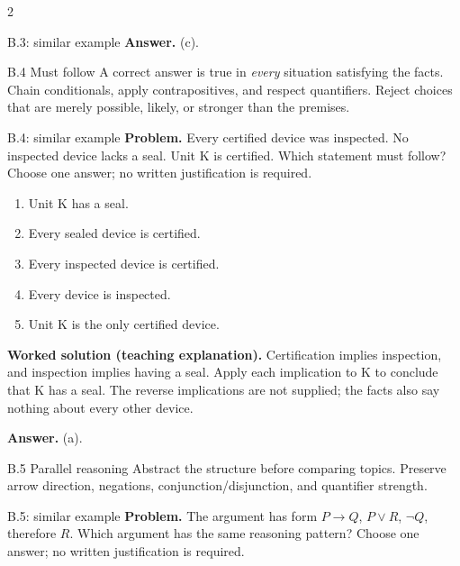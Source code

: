 \documentclass[10pt]{extarticle}
\begin{document}
\begin{multicols}{2}
\begin{workedbox}{B.3: similar example}
\textbf{Answer.} (c).
\end{workedbox}


\columnbreak
\begin{methodbox}{B.4 Must follow}
A correct answer is true in \emph{every} situation satisfying the facts. Chain
conditionals, apply contrapositives, and respect quantifiers. Reject choices that
are merely possible, likely, or stronger than the premises.
\end{methodbox}

\begin{workedbox}{B.4: similar example}
\textbf{Problem.} Every certified device was inspected. No inspected device lacks a seal. Unit K is certified. Which statement must follow? Choose one answer; no written justification is required.

\begin{enumerate}[label=(\alph*)]
\item Unit K has a seal.
\item Every sealed device is certified.
\item Every inspected device is certified.
\item Every device is inspected.
\item Unit K is the only certified device.
\end{enumerate}
\textbf{Worked solution (teaching explanation).} Certification implies inspection, and inspection implies having a seal. Apply each implication to K to conclude that K has a seal. The reverse implications are not supplied; the facts also say nothing about every other device.

\textbf{Answer.} (a).
\end{workedbox}

\begin{methodbox}{B.5 Parallel reasoning}
Abstract the structure before comparing topics. Preserve arrow direction,
negations, conjunction/disjunction, and quantifier strength.
\end{methodbox}

\begin{workedbox}{B.5: similar example}
\textbf{Problem.} The argument has form $P\to Q$, $P\lor R$, $\neg Q$, therefore $R$. Which argument has the same reasoning pattern? Choose one answer; no written justification is required.


\end{workedbox}
\end{multicols}
\end{document}
